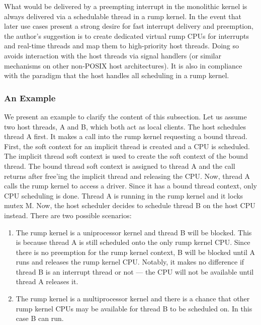 What would be delivered by a preempting interrupt in the monolithic
kernel is always delivered via a schedulable thread in a rump kernel.
In the event that later use cases present a strong desire for fast
interrupt delivery and preemption, the author's suggestion is to
create dedicated virtual rump CPUs for interrupts and real-time
threads and map them to high-priority host threads.  Doing so avoids
interaction with the host threads via signal handlers (or
similar mechanisms on other non-POSIX host architectures).  It is
also in compliance with the paradigm that the host handles all
scheduling in a rump kernel.

\subsubsection{An Example}
\label{sect:lexample}

We present an example to clarify the content of this subsection.
Let us assume two host threads, A and B, which both act as local clients.
The host schedules thread A first.  It makes a call into the rump kernel
requesting a bound thread.  First, the soft context for an implicit thread
is created and a CPU is scheduled.  The implicit thread soft context is
used to create the soft context of the bound thread.  The bound thread
soft context is assigned to thread A and the call returns after free'ing
the implicit thread and releasing the CPU.  Now, thread A calls the
rump kernel to access a driver.  Since it has a bound thread context,
only CPU scheduling is done.  Thread A is running in the rump kernel and
it locks mutex M.  Now, the host scheduler decides to schedule thread
B on the host CPU instead.  There are two possible scenarios:

\begin{enumerate}
\item The rump kernel is a uniprocessor kernel and thread B will be blocked.
This is because thread A is still scheduled onto the only rump kernel
CPU.  Since there is no preemption for the rump kernel context, B will
be blocked until A runs and releases the rump kernel CPU.  Notably,
it makes no difference if thread B is an interrupt thread or not ---
the CPU will not be available until thread A releases it.

\item The rump kernel is a multiprocessor kernel and there is a
chance that other rump kernel CPUs may be available for thread B to be
scheduled on.  In this case B can run.
\end{enumerate}

